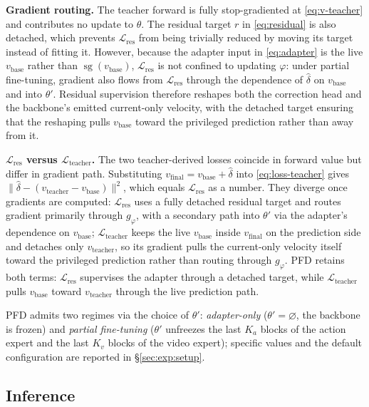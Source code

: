 \documentclass{article}
\begin{document}
\noindent\textbf{Gradient routing.} The teacher forward is fully stop-gradiented at \eqref{eq:v-teacher} and contributes no update to $\theta$. The residual target $r$ in \eqref{eq:residual} is also detached, which prevents $\mathcal{L}_\mathrm{res}$ from being trivially reduced by moving its target instead of fitting it. However, because the adapter input in \eqref{eq:adapter} is the live $v_\mathrm{base}$ rather than $\operatorname{sg}(v_\mathrm{base})$, $\mathcal{L}_\mathrm{res}$ is not confined to updating $\varphi$: under partial fine-tuning, gradient also flows from $\mathcal{L}_\mathrm{res}$ through the dependence of $\hat{\delta}$ on $v_\mathrm{base}$ and into $\theta'$. Residual supervision therefore reshapes both the correction head and the backbone's emitted current-only velocity, with the detached target ensuring that the reshaping pulls $v_\mathrm{base}$ toward the privileged prediction rather than away from it.

\noindent\textbf{$\mathcal{L}_\mathrm{res}$ versus $\mathcal{L}_\mathrm{teacher}$.} The two teacher-derived losses coincide in forward value but differ in gradient path. Substituting $v_\mathrm{final} = v_\mathrm{base} + \hat{\delta}$ into \eqref{eq:loss-teacher} gives $\lVert \hat{\delta} - (v_\mathrm{teacher} - v_\mathrm{base}) \rVert^2$, which equals $\mathcal{L}_\mathrm{res}$ as a number. They diverge once gradients are computed: $\mathcal{L}_\mathrm{res}$ uses a fully detached residual target and routes gradient primarily through $g_\varphi$, with a secondary path into $\theta'$ via the adapter's dependence on $v_\mathrm{base}$; $\mathcal{L}_\mathrm{teacher}$ keeps the live $v_\mathrm{base}$ inside $v_\mathrm{final}$ on the prediction side and detaches only $v_\mathrm{teacher}$, so its gradient pulls the current-only velocity itself toward the privileged prediction rather than routing through $g_\varphi$. PFD retains both terms: $\mathcal{L}_\mathrm{res}$ supervises the adapter through a detached target, while $\mathcal{L}_\mathrm{teacher}$ pulls $v_\mathrm{base}$ toward $v_\mathrm{teacher}$ through the live prediction path.

PFD admits two regimes via the choice of $\theta'$: \emph{adapter-only} ($\theta' = \varnothing$, the backbone is frozen) and \emph{partial fine-tuning} ($\theta'$ unfreezes the last $K_a$ blocks of the action expert and the last $K_v$ blocks of the video expert); specific values and the default configuration are reported in \S\ref{sec:exp:setup}.

\subsection{Inference}
\label{sec:method:inference}
\end{document}
